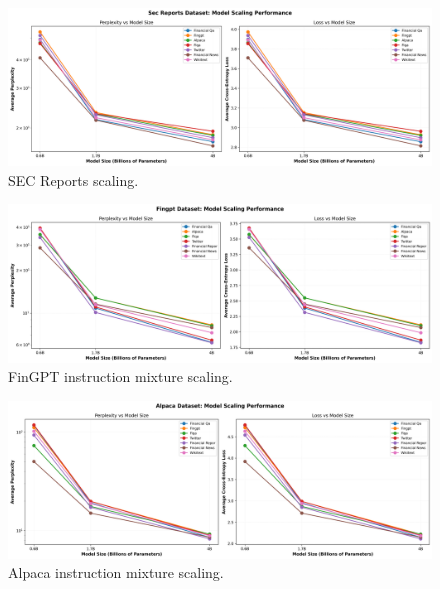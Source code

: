 

\begin{figure}[H]
  \centering
  \includegraphics[width=\textwidth]{../thesis/figures/scaling_sec_reports.png}
  \caption{SEC Reports scaling.}\label{fig:scaling_sec_reports}
\end{figure}



\begin{figure}[H]
  \centering
  \includegraphics[width=\textwidth]{../thesis/figures/scaling_fingpt.png}
  \caption{FinGPT instruction mixture scaling.}\label{fig:scaling_fingpt}
\end{figure}



\begin{figure}[H]
  \centering
  \includegraphics[width=\textwidth]{../thesis/figures/scaling_alpaca.png}
  \caption{Alpaca instruction mixture scaling.}\label{fig:scaling_alpaca}
\end{figure}

